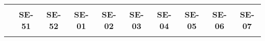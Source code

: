 \begin{tabular}{lccccccccc}
	\textbf{}              & \multicolumn{1}{l}{}                        & \multicolumn{1}{l}{}      & \multicolumn{1}{l}{}                         & \multicolumn{1}{l}{}                         & \multicolumn{1}{l}{}                         & \multicolumn{1}{l}{}                        & \multicolumn{1}{l}{}                         & \multicolumn{1}{l}{}                         & \multicolumn{1}{l}{}     \\
	\textbf{}                                                                               
	&\textbf{SE-51}					 			&\textbf{SE-52}
	&\textbf{SE-01}								&\textbf{SE-02}					 &\textbf{SE-03}
	&\textbf{SE-04}								&\textbf{SE-05}	
	&\textbf{SE-06}								&\textbf{SE-07}\\
	\textbf{}              
	  	

\end{tabular}
